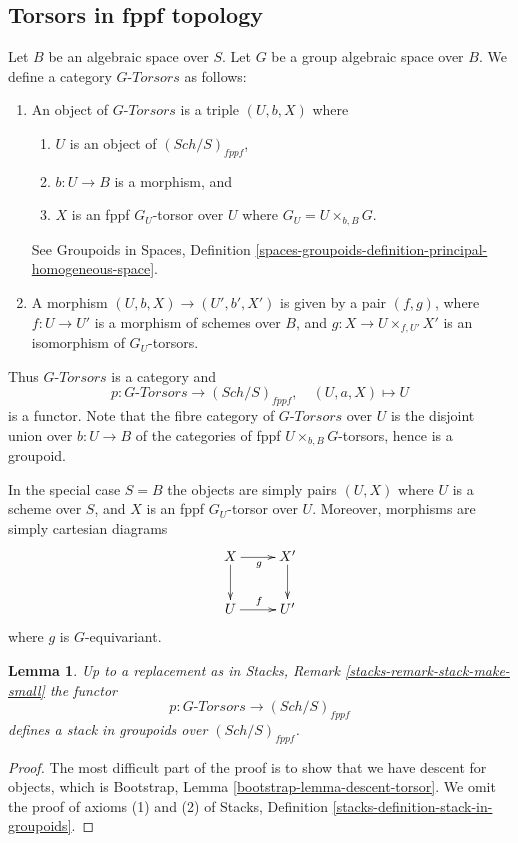 \documentclass{stacks-project}
\theoremstyle{plain}
\newtheorem{lemma}[subsection]{Lemma}
\theoremstyle{definition}
\theoremstyle{remark}
\numberwithin{equation}{subsection}
\def\Sch{\mathit{Sch}}
\begin{document}
\subsection{Torsors in fppf topology}
\label{subsection-fppf-torsors}

\noindent
Let $B$ be an algebraic space over $S$.
Let $G$ be a group algebraic space over $B$.
We define a category $G\textit{-Torsors}$ as follows:
\begin{enumerate}
\item An object of $G\textit{-Torsors}$ is a triple $(U, b, X)$ where
\begin{enumerate}
\item $U$ is an object of $(\Sch/S)_{fppf}$,
\item $b : U \to B$ is a morphism, and
\item $X$ is an fppf $G_U$-torsor over $U$ where $G_U = U \times_{b, B} G$.
\end{enumerate}
See
Groupoids in Spaces,
Definition \ref{spaces-groupoids-definition-principal-homogeneous-space}.
\item A morphism $(U, b, X) \to (U', b', X')$ is given
by a pair $(f, g)$, where $f : U \to U'$ is a morphism of schemes
over $B$, and $g : X \to U \times_{f, U'} X'$ is an
isomorphism of $G_U$-torsors.
\end{enumerate}
Thus $G\textit{-Torsors}$ is a category and
$$
p : G\textit{-Torsors} \longrightarrow (\Sch/S)_{fppf},
\quad
(U, a, X) \longmapsto U
$$
is a functor. Note that the fibre category of $G\textit{-Torsors}$
over $U$ is the disjoint union over $b : U \to B$
of the categories of fppf $U \times_{b, B} G$-torsors,
hence is a groupoid.

\medskip\noindent
In the special case $S = B$ the objects are simply pairs
$(U, X)$ where $U$ is a scheme over $S$, and $X$ is an fppf
$G_U$-torsor over $U$. Moreover, morphisms are simply cartesian
diagrams
$$
\xymatrix{
X \ar[d] \ar[r]_g & X' \ar[d] \\
U \ar[r]^f & U'
}
$$
where $g$ is $G$-equivariant.

\begin{lemma}
\label{lemma-torsors-stack-in-groupoids}
Up to a replacement as in
Stacks, Remark \ref{stacks-remark-stack-make-small}
the functor
$$
p : G\textit{-Torsors} \longrightarrow (\Sch/S)_{fppf}
$$
defines a stack in groupoids over $(\Sch/S)_{fppf}$.
\end{lemma}

\begin{proof}
The most difficult part of the proof is to show that we have descent for
objects, which is
Bootstrap, Lemma \ref{bootstrap-lemma-descent-torsor}.
We omit the proof of axioms (1) and (2) of
Stacks, Definition \ref{stacks-definition-stack-in-groupoids}.
\end{proof}
\end{document}
